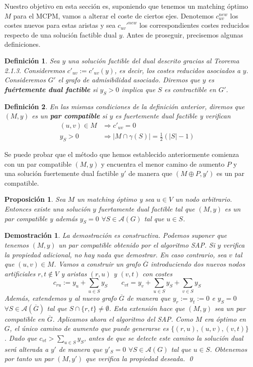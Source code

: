\documentclass[twoside,a4paper,openright,12pt]{book}
\newtheorem{defi}{Definici\'on}[section]
\newtheorem{prop}{Proposici\'on}[section]
\newtheorem*{dem}{Demostración}
\begin{document}
Nuestro objetivo en esta sección es, suponiendo que tenemos un matching óptimo $M$ para el MCPM, vamos a alterar el coste de ciertos ejes. Denotemos $c_{uv}^{new}$ los costes nuevos para estas aristas y sea $c_{uv}'^{new}$ los correspondientes costes reducidos respecto de una solución factible dual $y$. Antes de proseguir, precisemos algunas definiciones.
\begin{defi}
Sea $y$ una solución factible del dual descrito gracias al Teorema 2.1.3. Consideremos $c'_{uv}:=c'_{uv}(y)$, es decir, los costes reducidos asociados a $y$. Consideremos $G'$ el grafo de admisibilidad asociado. Diremos que $y$ es \textbf{fuértemente dual factible} si $y_S>0$ implica que $S$ es contractible en $G'$.
\end{defi}
\begin{defi}
En las mismas condiciones de la definición anterior, diremos que $(M,y)$ es un \textbf{par compatible} si $y$ es fuertemente dual factible y verifican
\begin{align*}
(u,v)\in M &\Rightarrow c'_{uv} = 0\\
y_S>0&\Rightarrow |M\cap \gamma(S)| = \frac{1}{2}(|S|-1)
\end{align*}
\end{defi}
Se puede probar que el método que hemos establecido anteriormente comienza con un par compatible $(M,y)$ y encuentra el menor camino de aumento $P$ y una solución fuertemente dual factible $y'$ de manera que $(M\oplus P,y')$ es un par compatible.
\begin{prop}
Sea $M$ un matching óptimo y sea $u\in V$ un nodo arbitrario. Entonces existe una solución $y$ fuertamente dual factible tal que $(M,y)$ es un par compatible y además $y_S=0$ $\forall S \in \mathcal{A}(G)$ tal que $u \in S$.
\end{prop}
\begin{dem}
La demostración es constructiva. Podemos suponer que tenemos $(M,y)$ un par compatible obtenido por el algoritmo SAP. Si $y$ verifica la propiedad adicional, no hay nada que demostrar. En caso contrario, sea $v$ tal que $(u,v)\in M$. Vamos a construir un grafo $\overline{G}$ introduciendo dos nuevos nodos artificiales $r,t\notin V$ y aristas $(r,u)$ y $(v,t)$ con costes 
$$
c_{ru}:= y_u+\sum_{u\in S}y_S \qquad c_{vt} = y_v + \sum_{u\in S}y_S  +\sum_{v\in S}y_S 
$$
Además, extendemos $y$ al nuevo grafo $\overline{G}$ de manera que $y_r:=y_t:=0$ e $y_S = 0$ $\forall S \in \mathcal{A}(\overline{G})$ tal que $S\cap\{r,t\}\neq \emptyset$. Esta extensión hace que $(M,y)$ sea un par compatible en $\overline{G}$. Aplicamos ahora el algoritmo del SAP. Como $M$ era óptimo en $G$, el único camino de aumento que puede generarse es $\{(r,u),(u,v),(v,t)\}$. Dado que $c_{vt}>\sum_{u\in S}y_S$, antes de que se detecte este camino la solución dual será alterada a $y'$ de manera que $y'_S = 0$ $\forall S \in \mathcal{A}(G)$ tal que $u \in S$. Obtenemos por tanto un par $(M,y')$ que verifica la propiedad deseada. \qed
\end{dem}
\end{document}
